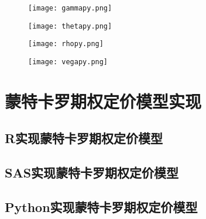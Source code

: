	
	
	\begin{figure}[htb] %
		\centering
		\texttt{[image: gammapy.png]}
		\label{fig:xfig1}
	\end{figure}
	


	
	
	
	\begin{figure}[htb] %
		\centering
		\texttt{[image: thetapy.png]}
		\label{fig:xfig1}
	\end{figure}





	\begin{figure}[htb] %
		\centering
		\texttt{[image: rhopy.png]}
		\label{fig:xfig1}
	\end{figure}




	\begin{figure}[htb] %
		\centering
		\texttt{[image: vegapy.png]}
		\label{fig:xfig1}
	\end{figure}
	
	
	
\section{蒙特卡罗期权定价模型实现}

\subsection{R实现蒙特卡罗期权定价模型}

\subsection{SAS实现蒙特卡罗期权定价模型}

\subsection{Python实现蒙特卡罗期权定价模型}








